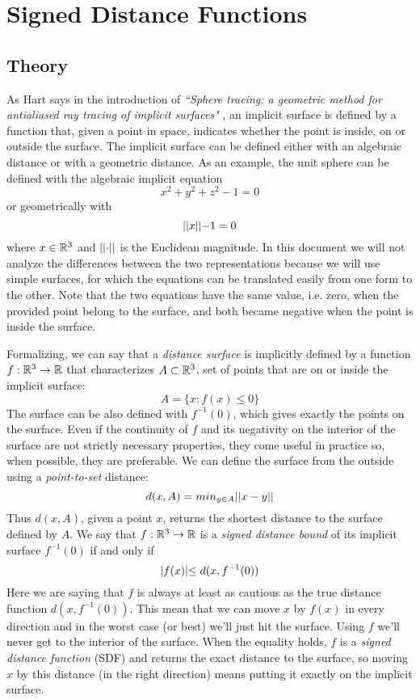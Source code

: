 
\section{Signed Distance Functions}
\subsection{Theory}
As Hart says in the introduction of
\emph{``Sphere tracing: a geometric method for antialiased ray tracing of implicit surfaces"}
\cite{hart1996}, an implicit surface is defined by a function that, given a point in space, indicates whether the point is inside, on or outside the surface.
The implicit surface can be defined either with an algebraic distance or with a geometric distance.
As an example, the unit sphere can be defined with the algebraic implicit equation
$$ x^2 + y^2 + z^2 - 1 = 0 $$
or geometrically with
$$ \lvert\lvert x \lvert\lvert - 1= 0 $$
where $x \in \mathbb{R}^3$ and $\lvert\lvert \cdot \lvert\lvert$ is the Euclidean magnitude.
In this document we will not analyze the differences between the two representations because we will use simple surfaces, for which the equations can be translated easily from one form to the other.
Note that the two equations have the same value, i.e. zero, when the provided point belong to the surface, and both became negative when the point is inside the surface.

Formalizing, we can say that a \emph{distance surface} is implicitly defined by a function 
$f : \mathbb{R}^3 \to \mathbb{R}$ that characterizes $A \subset \mathbb{R}^3$, set of points that are on or inside the implicit surface:
$$ A = \{ x: f(x) \leq 0\} $$
The surface can be also defined with $f^{-1}(0)$, which gives exactly the points on the surface.
Even if the continuity of $f$ and its negativity on the interior of the surface are not strictly necessary properties, they come useful in practice so, when possible, they are preferable.
We can define the surface from the outside using a \emph{point-to-set} distance:
$$
d(x,A) = min_{y \in A} \lvert\lvert x - y \lvert\lvert
$$
Thus $d(x,A)$, given a point $x$, returns the shortest distance to the surface defined by $A$.
We say that $f: \mathbb{R}^3 \to \mathbb{R}$ is a \emph{signed distance bound} of its implicit surface $f^{-1}(0)$ if and only if
$$
\lvert f(x) \lvert \leq d(x,f^{-1}(0))
$$
Here we are saying that $f$ is always at least as cautious as the true distance function $d(x,f^{-1}(0))$.
This mean that we can move $x$ by $f(x)$ in every direction and in the worst case (or best) we'll just hit the surface.
Using $f$ we'll never get to the interior of the surface.
When the equality holds, $f$ is a \emph{signed distance function} (SDF) and returns the exact distance to the surface, so moving $x$ by this distance (in the right direction) means putting it exactly on the implicit surface.

